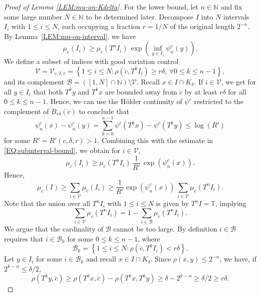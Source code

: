 \documentclass[11pt,reqno]{amsart}
\theoremstyle{plain}
\theoremstyle{definition}
\newcommand{\N}{{\mathbb N}}
\newcommand{\mc}{\mathcal}
\newcommand{\TT}{\mathbb{T}}
\begin{document}
\begin{proof}[Proof of Lemma \ref{LEM:mu-on-Kdelta}]
For the lower bound, let $n \in \N$ and fix some large number $N \in \N$ to be determined later. Decompose $I$ into $N$ intervals $I_i$ with $1\leqslant i \leqslant N$, each occupying a fraction $r = 1/N$ of the original length $2^{-n}$. By Lemma~\ref{LEM:mu-on-interval}, we have
\begin{equation}
\label{EQ:subinterval-bound}
\mu_c(I_i) \geqslant \mu_c(T^n I_i)\,  \exp \left( \inf_{y \in I_i} \psi_n^c(y) \right).
\end{equation}
We define a subset of indices with good variation control
\[
\mc V = \mc V_{c, \delta, r}=\left\{ 1 \leqslant i \leqslant N: \rho(\breve{c},T^k I_i) \geqslant r \delta, \, \forall 0\leqslant k \leqslant n-1 \right\},
\]
and its complement $\mc B = ([1,N] \cap \N) \setminus \mc V$. Recall $x \in I \cap K_{\delta}$. If $i \in \mc V$, we get for all $y \in I_i$ that both $T^k y$ and $T^k x$ are bounded away from $\breve{c}$ by at least $r \delta$ for all $0\leqslant k \leqslant n-1$. Hence, we can use the H\"{o}lder continuity of $\psi^c$ restricted to the complement of $B_{r\delta}(\breve{c})$ to conclude that 
\[
\psi_n^c(x) - \psi_n^c(y) = \sum_{k=0}^{n-1} \psi^c(T^k x) - \psi^c(T^k y) \leqslant \log(R')
\]
for some $R' = R'(c,\delta,r) > 1$.
Combining this with the estimate in \eqref{EQ:subinterval-bound}, we obtain for $i \in \mc V$,
\[
\mu_c(I_i) \geqslant \mu_c(T^n I_i)\, \frac{1}{R'}\, \exp\left( \psi_n^c(x) \right).
\] 
Hence,
\begin{equation}
\label{EQ:mu-interval-lower}
\mu_c(I) \geqslant \sum_{i \in \mc V} \mu_c(I_i) 
\geqslant \frac{1}{R'} \exp\left(\psi_n^c(x) \right)\, \sum_{i \in \mc V} \mu_c(T^n I_i).
\end{equation}
Note that the union over all $T^n I_i$ with $1\leqslant i \leqslant N$ is given by $T^n I = \TT$, implying
\begin{equation}
\label{EQ:bad-vs-good-indices}
\sum_{i \in \mc V} \mu_c(T^n I_i) = 1 - \sum_{i \in \mc B} \mu_c(T^n I_i).
\end{equation}
We argue that the cardinality of $\mc B$ cannot be too large. By definition $i \in \mc B$ requires that $i \in \mc B_k$ for some $0 \leqslant k \leqslant n-1$, where
\[
\mc B_k = \left\{ 1 \leqslant i \leqslant N: \rho(\breve{c} , T^k I_i) < r\delta \right\}.
\]
Let $y \in I_i$ for some $i \in \mc B_k$ and recall $x \in I \cap K_{\delta}$.
Since $\rho(x,y) \leqslant 2^{-n}$, we have, if $2^{k-n} \leqslant \delta/2$,
\[
\rho(T^k y, \breve{c}) \geqslant \rho(T^k x, \breve{c}) - \rho(T^k x, T^k y)
\geqslant \delta - 2^{k-n} \geqslant \delta/2 \geqslant r \delta.
\]
\end{proof}
\end{document}
